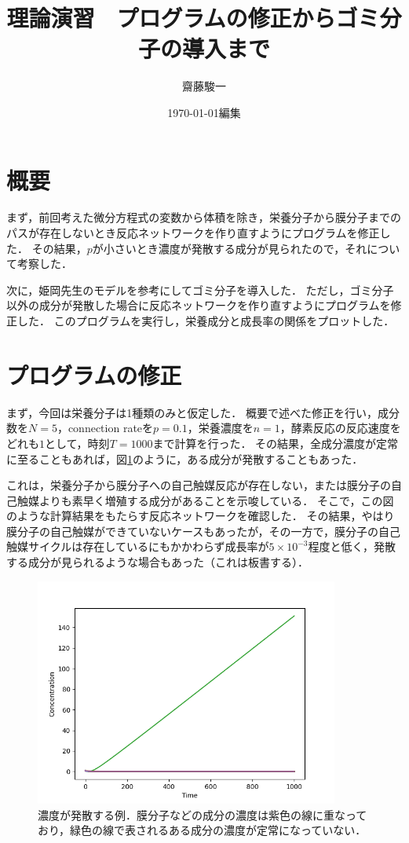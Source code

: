 \documentclass[a4paper,11pt]{jsarticle}
\begin{document}
\title{理論演習　プログラムの修正からゴミ分子の導入まで}
\author{齋藤駿一}
\date{\today 編集}
\maketitle

\section{概要}
まず，前回考えた微分方程式の変数から体積を除き，栄養分子から膜分子までのパスが存在しないとき反応ネットワークを作り直すようにプログラムを修正した．
その結果，$p$が小さいとき濃度が発散する成分が見られたので，それについて考察した．

次に，姫岡先生のモデルを参考にしてゴミ分子を導入した．
ただし，ゴミ分子以外の成分が発散した場合に反応ネットワークを作り直すようにプログラムを修正した．
このプログラムを実行し，栄養成分と成長率の関係をプロットした．

\section{プログラムの修正}
まず，今回は栄養分子は1種類のみと仮定した．
概要で述べた修正を行い，成分数を$N=5$，connection rateを$p=0.1$，栄養濃度を$n=1$，酵素反応の反応速度をどれも$1$として，時刻$T=1000$まで計算を行った．
その結果，全成分濃度が定常に至ることもあれば，図\ref{fig:nonwaste_cons_div_N5_2}のように，ある成分が発散することもあった．

これは，栄養分子から膜分子への自己触媒反応が存在しない，または膜分子の自己触媒よりも素早く増殖する成分があることを示唆している．
そこで，この図のような計算結果をもたらす反応ネットワークを確認した．
その結果，やはり膜分子の自己触媒ができていないケースもあったが，その一方で，膜分子の自己触媒サイクルは存在しているにもかかわらず成長率が$5\times 10^{-3}$程度と低く，発散する成分が見られるような場合もあった（これは板書する）．


\begin{figure}[htbp]
  \centering
  \includegraphics[width=10cm]{nonwaste_cons_div_N5_2.png}
  \caption{濃度が発散する例．膜分子などの成分の濃度は紫色の線に重なっており，緑色の線で表されるある成分の濃度が定常になっていない．}
  \label{fig:nonwaste_cons_div_N5_2}
\end{figure}
\end{document}
